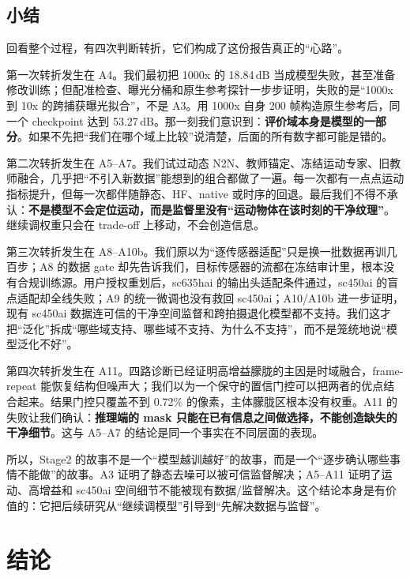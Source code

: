 \documentclass[11pt,a4paper,UTF8,fontset=fandol]{ctexart}
\newcommand{\db}{\ensuremath{\,\mathrm{dB}}}
\begin{document}
\subsection{小结}

回看整个过程，有四次判断转折，它们构成了这份报告真正的“心路”。

第一次转折发生在 A4。我们最初把 1000x 的 18.84\db{} 当成模型失败，甚至准备修改训练；但配准检查、曝光分桶和原生参考探针一步步证明，失败的是“1000x 到 10x 的跨捕获曝光拟合”，不是 A3。用 1000x 自身 200 帧构造原生参考后，同一个 checkpoint 达到 53.27\db。那一刻我们意识到：\textbf{评价域本身是模型的一部分}。如果不先把“我们在哪个域上比较”说清楚，后面的所有数字都可能是错的。

第二次转折发生在 A5--A7。我们试过动态 N2N、教师锚定、冻结运动专家、旧教师融合，几乎把“不引入新数据”能想到的组合都做了一遍。每一次都有一点点运动指标提升，但每一次都伴随静态、HF、native 或时序的回退。最后我们不得不承认：\textbf{不是模型不会定位运动，而是监督里没有“运动物体在该时刻的干净纹理”}。继续调权重只会在 trade-off 上移动，不会创造信息。

第三次转折发生在 A8--A10b。我们原以为“逐传感器适配”只是换一批数据再训几百步；A8 的数据 gate 却先告诉我们，目标传感器的流都在冻结审计里，根本没有合规训练源。用户授权重划后，sc635hai 的输出头适配条件通过，sc450ai 的盲点适配却全线失败；A9 的统一微调也没有救回 sc450ai；A10/A10b 进一步证明，现有 sc450ai 数据连可信的干净空间监督和跨拍摄退化模型都不支持。我们这才把“泛化”拆成“哪些域支持、哪些域不支持、为什么不支持”，而不是笼统地说“模型泛化不好”。

第四次转折发生在 A11。四路诊断已经证明高增益朦胧的主因是时域融合，frame-repeat 能恢复结构但噪声大；我们以为一个保守的置信门控可以把两者的优点结合起来。结果门控只覆盖不到 0.72\% 的像素，主体朦胧区根本没有权重。A11 的失败让我们确认：\textbf{推理端的 mask 只能在已有信息之间做选择，不能创造缺失的干净细节}。这与 A5--A7 的结论是同一个事实在不同层面的表现。

所以，Stage2 的故事不是一个“模型越训越好”的故事，而是一个“逐步确认哪些事情不能做”的故事。A3 证明了静态去噪可以被可信监督解决；A5--A11 证明了运动、高增益和 sc450ai 空间细节不能被现有数据/监督解决。这个结论本身是有价值的：它把后续研究从“继续调模型”引导到“先解决数据与监督”。

\section{结论}
\end{document}
